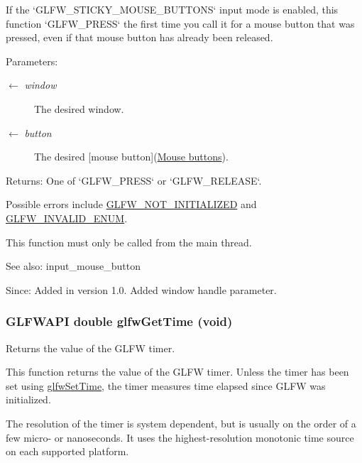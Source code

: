 If the `GLFW\_\-STICKY\_\-MOUSE\_\-BUTTONS` input mode is enabled, this function `GLFW\_\-PRESS` the first time you call it for a mouse button that was pressed, even if that mouse button has already been released.

\begin{Desc}
\item[Parameters:]
\begin{description}
\item[\mbox{$\leftarrow$} {\em window}]The desired window. \item[\mbox{$\leftarrow$} {\em button}]The desired \mbox{[}mouse button\mbox{]}(\hyperlink{group__buttons}{Mouse buttons}). \end{description}
\end{Desc}
\begin{Desc}
\item[Returns:]One of `GLFW\_\-PRESS` or `GLFW\_\-RELEASE`.\end{Desc}
Possible errors include \hyperlink{group__errors_g2374ee02c177f12e1fa76ff3ed15e14a}{GLFW\_\-NOT\_\-INITIALIZED} and \hyperlink{group__errors_g76f6bb9c4eea73db675f096b404593ce}{GLFW\_\-INVALID\_\-ENUM}.

This function must only be called from the main thread.

\begin{Desc}
\item[See also:]input\_\-mouse\_\-button\end{Desc}
\begin{Desc}
\item[Since:]Added in version 1.0.  Added window handle parameter. \end{Desc}
\hypertarget{group__input_g03d4a1039b8662c71eeb40beea8cb622}{
\subsubsection[glfwGetTime]{\setlength{\rightskip}{0pt plus 5cm}GLFWAPI double glfwGetTime (void)}}
\label{group__input_g03d4a1039b8662c71eeb40beea8cb622}


Returns the value of the GLFW timer. 

This function returns the value of the GLFW timer. Unless the timer has been set using \hyperlink{group__input_g94360a3628a09f32708f83cc3fa48590}{glfwSetTime}, the timer measures time elapsed since GLFW was initialized.

The resolution of the timer is system dependent, but is usually on the order of a few micro- or nanoseconds. It uses the highest-resolution monotonic time source on each supported platform.

